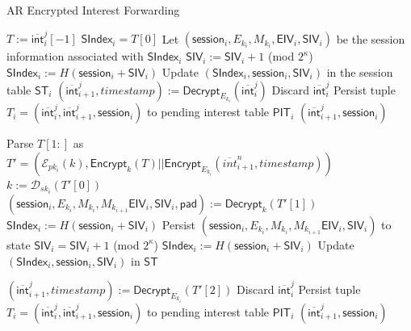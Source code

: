 \documentclass[10pt]{article}
\begin{document}
\begin{algorithm}[ht!]
  \caption{AR Encrypted Interest Forwarding}
  \begin{algorithmic}[1]
    \State $T := \overline{\mathsf{int}}_i^j[-1]$
\State $\mathsf{SIndex}_i = T[0]$
 
  \State Let $(\mathsf{session}_i, E_{k_i}, M_{k_i}, \mathsf{EIV}_i, \mathsf{SIV}_i)$ be the session information associated with $\mathsf{SIndex}_i$
  \State $\mathsf{SIV}_i := \mathsf{SIV}_i + 1$ (mod $2^{\kappa}$)
  \State $\mathsf{SIndex}_i := H(\mathsf{session}_i + \mathsf{SIV}_i)$
  \State Update $(\mathsf{SIndex}_i, \mathsf{session}_i, \mathsf{SIV}_i)$ in the session table $\mathsf{ST}_i$
  \State $(\overline{\mathsf{int}}_{i+1}^{j}, timestamp) := \mathsf{Decrypt}_{E_{k_i}}(\overline{\mathsf{int}}_{i}^{j})$
    \State Discard $\overline{\mathsf{int}}_{i}^{j}$
  \Else
    \State Persist tuple $T_i = (\overline{\mathsf{int}}_{i}^{j}, \overline{\mathsf{int}}_{i+1}^{j}, \mathsf{session}_i)$ to pending interest table $\mathsf{PIT}_i$
    \State \Return $(\overline{\mathsf{int}}_{i+1}^{j}, \mathsf{session}_i)$
  \EndIf
\Else {}

  \State Parse $T[1:]$ as $T' = (\mathcal{E}_{pk_i}(k), \mathsf{Encrypt}_k(T) || \mathsf{Encrypt}_{E_{k_i}}(\overline{int}_{i+1}^n, timestamp))$
  \State $k := \mathcal{D}_{sk_i}(T'[0])$
  \State $(\mathsf{session}_i, E_{k_i}, M_{k_i}, M_{k_{i+1}} \mathsf{EIV}_i, \mathsf{SIV}_i, \mathsf{pad}) := \mathsf{Decrypt}_k(T'[1])$
  \State $\mathsf{SIndex}_i := H(\mathsf{session}_i + \mathsf{SIV}_i)$
  \State Persist $(\mathsf{session}_i, E_{k_i}, M_{k_i}, M_{k_{i+1}} \mathsf{EIV}_i, \mathsf{SIV}_i)$ to state  
  \State $\mathsf{SIV}_i = \mathsf{SIV}_i + 1$ (mod $2^{\kappa}$)
  \State $\mathsf{SIndex}_i := H(\mathsf{session}_i + \mathsf{SIV}_i)$
  \State Update $(\mathsf{SIndex}_i, \mathsf{session}_i, \mathsf{SIV}_i)$ in $\mathsf{ST}$

  \State $(\overline{\mathsf{int}}_{i+1}^{j}, timestamp) := \mathsf{Decrypt}_{E_{k_i}}(T'[2])$
    \State Discard $\overline{\mathsf{int}}_{i}^{j}$
  \Else
    \State Persist tuple $T_i = (\overline{\mathsf{int}}_{i}^{j}, \overline{\mathsf{int}}_{i+1}^{j}, \mathsf{session}_i)$ to pending interest table $\mathsf{PIT}_i$
    \State \Return $(\overline{\mathsf{int}}_{i+1}^{j}, \mathsf{session}_i)$
  \EndIf


\end{algorithmic}
\end{algorithm}
\end{document}
